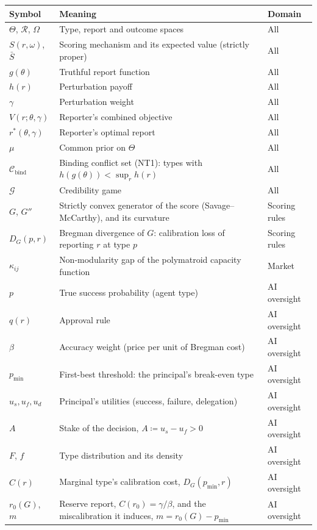 \documentclass[acmsmall,nonacm,screen]{acmart}
\theoremstyle{acmplain}%
\theoremstyle{acmdefinition}%
\newcommand{\calG}{\mathcal{G}}
\newcommand{\calR}{\mathcal{R}}
\newcommand{\Cbind}{\mathcal{C}_{\mathrm{bind}}}
\newcommand{\Sbar}{\bar{S}}
\numberwithin{equation}{section}
\begin{document}
\begin{center}
\small
\renewcommand{\arraystretch}{0.92}
\begin{tabular}{lp{8cm}l}
\hline
Symbol & Meaning & Domain \\
\hline
$\Theta$, $\calR$, $\Omega$ & Type, report and outcome spaces & All \\
$S(r,\omega)$, $\Sbar$ & Scoring mechanism and its expected value (strictly proper) & All \\
$g(\theta)$ & Truthful report function & All \\
$h(r)$ & Perturbation payoff & All \\
$\gamma$ & Perturbation weight & All \\
$V(r;\theta,\gamma)$ & Reporter's combined objective & All \\
$r^*(\theta,\gamma)$ & Reporter's optimal report & All \\
$\mu$ & Common prior on $\Theta$ & All \\
$\Cbind$ & Binding conflict set (NT1): types with $h(g(\theta)) < \sup_r h(r)$ & All \\
$\calG$ & Credibility game & All \\
$G$, $G''$ & Strictly convex generator of the score (Savage--McCarthy), and its curvature & Scoring rules \\
$D_G(p,r)$ & Bregman divergence of $G$: calibration loss of reporting $r$ at type $p$ & Scoring rules \\
$\kappa_{ij}$ & Non-modularity gap of the polymatroid capacity function & Market \\
$p$ & True success probability (agent type) & AI oversight \\
$q(r)$ & Approval rule & AI oversight \\
$\beta$ & Accuracy weight (price per unit of Bregman cost) & AI oversight \\
$p_{\min}$ & First-best threshold: the principal's break-even type & AI oversight \\
$u_s, u_f, u_d$ & Principal's utilities (success, failure, delegation) & AI oversight \\
$A$ & Stake of the decision, $A \coloneqq u_s - u_f > 0$ & AI oversight \\
$F$, $f$ & Type distribution and its density & AI oversight \\
$C(r)$ & Marginal type's calibration cost, $D_G(p_{\min},r)$ & AI oversight \\
$r_0(G)$, $m$ & Reserve report, $C(r_0) = \gamma/\beta$, and the miscalibration it induces, $m = r_0(G) - p_{\min}$ & AI oversight \\

\end{tabular}
\end{center}
\end{document}
